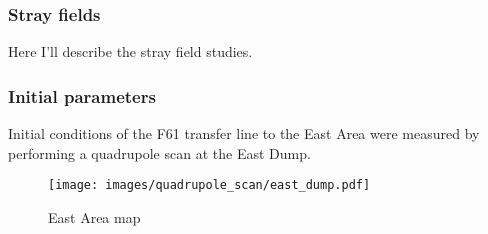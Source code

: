 \subsubsection{Stray fields}
Here I'll describe the stray field studies.
\subsubsection{Initial parameters}

Initial conditions of the F61 transfer line to the East Area were measured by performing a quadrupole scan at the East Dump.

\begin{figure}[H]
    \centering
    {\texttt{[image: images/quadrupole\_scan/east\_dump.pdf]}}
    \caption{East Area map}
    \label{fig:east_area_map}
\end{figure}